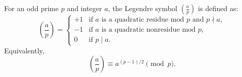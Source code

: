 For an odd prime $p$ and integer $a$, the Legendre symbol $\left(\frac{a}{p}\right)$ is defined as:
$$\left(\frac{a}{p}\right) = \begin{cases}
+1 & \text{if $a$ is a quadratic residue mod $p$ and } p \nmid a,\\
-1 & \text{if $a$ is a quadratic nonresidue mod $p$},\\
0 & \text{if } p \mid a.
\end{cases}$$
Equivalently,
$$\left(\frac{a}{p}\right) \equiv a^{(p-1)/2} \pmod{p}.$$
